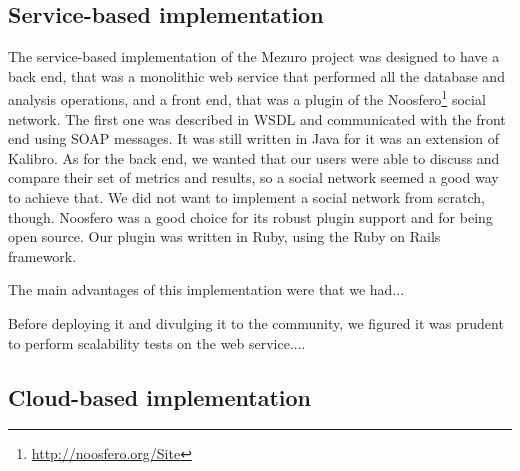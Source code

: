 \subsection{Service-based implementation}
\label{subsec:service-based-implementation}

The service-based implementation of the Mezuro project was designed to have a back end, that was a monolithic web service that performed all the database and analysis operations, and a front end, that was a plugin of the Noosfero\footnote{\url{http://noosfero.org/Site}} social network. The first one was described in WSDL and communicated with the front end using SOAP messages. It was still written in Java for it was an extension of Kalibro. As for the back end, we wanted that our users were able to discuss and compare their set of metrics and results, so a social network seemed a good way to achieve that. We did not want to implement a social network from scratch, though. Noosfero was a good choice for its robust plugin support and for being open source. Our plugin was written in Ruby, using the Ruby on Rails framework.

The main advantages of this implementation were that we had...

Before deploying it and divulging it to the community, we figured it was prudent to perform scalability tests on the web service....

\subsection{Cloud-based implementation}
\label{subsec:cloud-based-implementation}
